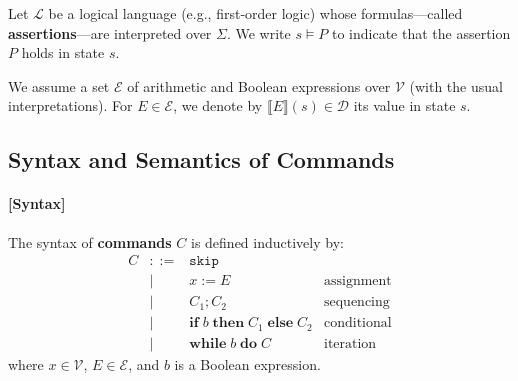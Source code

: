 Let \(\mathcal{L}\) be a logical language (e.g., first‐order logic) whose formulas---called \textbf{assertions}---are interpreted over \(\Sigma\). We write \(s \models P\) to indicate that the assertion \(P\) holds in state \(s\).

We assume a set \(\mathcal{E}\) of arithmetic and Boolean expressions over \(\mathcal{V}\) (with the usual interpretations). For \(E \in \mathcal{E}\), we denote by \(\llbracket E \rrbracket(s) \in \mathcal{D}\) its value in state \(s\).

\subsection{Syntax and Semantics of Commands}
\paragraph{[Syntax]} The syntax of \textbf{commands} \(C\) is defined inductively by:
\[
\begin{array}{rcll}
	C & ::= & \texttt{skip} & \\
	& \mid & x := E & \text{assignment} \\
	& \mid & C_1 ; C_2 & \text{sequencing} \\
	& \mid & \mathbf{if}\; b\; \mathbf{then}\; C_1\; \mathbf{else}\; C_2 & \text{conditional} \\
	& \mid & \mathbf{while}\; b\; \mathbf{do}\; C\; & \text{iteration}
\end{array}
\]
where \(x\in \mathcal{V}\), \(E\in \mathcal{E}\), and \(b\) is a Boolean expression.

